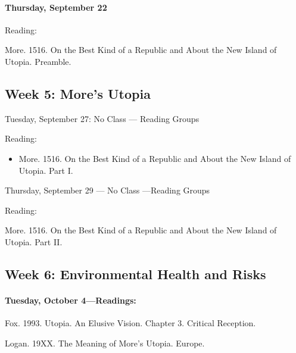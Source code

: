 \paragraph{Thursday, September 22}		
    
\noindent Reading:
    \begin{itemize*}
    \item More. 1516. On the Best Kind of a Republic and About the New Island of Utopia. Preamble.
    \end{itemize*}
    
    
    \subsection{\textbf{Week 5}: More's Utopia}
    
Tuesday, September 27: No Class --- Reading Groups

\noindent Reading:
    \begin{itemize}
    \item More. 1516. On the Best Kind of a Republic and About the New Island of Utopia. Part I.
    \end{itemize}
      
Thursday, September 29 --- No Class ---Reading Groups 
 
\noindent Reading:   
    \begin{itemize*}
    \item More. 1516. On the Best Kind of a Republic and About the New Island of Utopia. Part II.
    \end{itemize*}

\subsection{\textbf{Week 6}: Environmental Health and Risks}
      
\paragraph{Tuesday, October 4---Readings:}      
      \begin{itemize*}
      \item Fox. 1993. Utopia. An Elusive Vision. Chapter 3. Critical Reception.
      \item Logan. 19XX. The Meaning of More's Utopia. Europe. 
      \end{itemize*}

